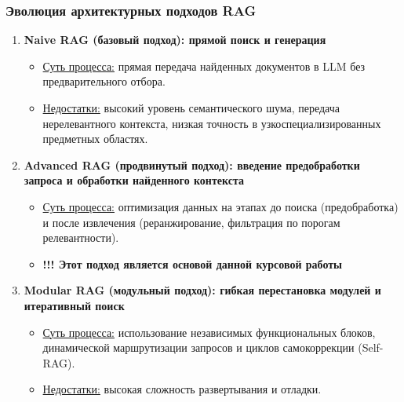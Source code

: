 \documentclass[aspectratio=169, xcolor={table}, usepdftitle=false]{beamer} %
\begin{document}
\begin{frame}
\frametitle{Эволюция архитектурных подходов RAG}
\small
\begin{enumerate}
    \item \textbf{Naive RAG (базовый подход): прямой поиск и генерация}
    \begin{itemize}
        \item \underline{Суть процесса:} прямая передача найденных документов в LLM без предварительного отбора.
        \item \underline{Недостатки:} высокий уровень семантического шума, передача нерелевантного контекста, низкая точность в узкоспециализированных предметных областях.
    \end{itemize}
    \vspace{0.2cm}
    \item \textbf{Advanced RAG (продвинутый подход): введение предобработки запроса и обработки найденного контекста}
    \begin{itemize}
        \item \underline{Суть процесса:} оптимизация данных на этапах до поиска (предобработка) и после извлечения (реранжирование, фильтрация по порогам релевантности).
        \item \textbf{!!! Этот подход является основой данной курсовой работы}
    \end{itemize}
    \vspace{0.2cm}
    \item \textbf{Modular RAG (модульный подход): гибкая перестановка модулей и итеративный поиск}
    \begin{itemize}
        \item \underline{Суть процесса:} использование независимых функциональных блоков, динамической маршрутизации запросов и циклов самокоррекции (Self-RAG).
        \item \underline{Недостатки:} высокая сложность развертывания и отладки.
    \end{itemize}
\end{enumerate}
\end{frame}
\end{document}
